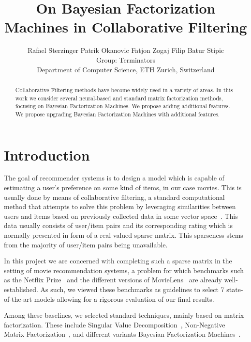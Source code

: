 \documentclass[10pt,conference,compsocconf]{IEEEtran}
\newcommand{\spacing}{\hspace{1cm}}
\begin{document}
    \title{On Bayesian Factorization Machines in Collaborative Filtering}

    \author{
        Rafael Sterzinger \spacing Patrik Okanovic \spacing Fatjon Zogaj \spacing Filip Batur Stipic\\
        Group: Terminators\\
        Department of Computer Science, ETH Zurich, Switzerland
    }

    \maketitle

    \begin{abstract}
        Collaborative Filtering methods have become widely used in a variety of areas. In this work we consider several neural-based and standard matrix factorization methods, focusing on Bayesian Factorization Machines. We propose adding additional features. We propose upgrading Bayesian Factorization Machines with additional features.

    \end{abstract}


    \section{Introduction}

    The goal of recommender systems is to design a model which is capable of estimating a user's preference on some kind of items, in our case movies.
    This is usually done by means of collaborative filtering, a standard computational method that attempts to solve this problem by leveraging similarities between users and items based on previously collected data in some vector space~\cite{CF_survey}.
    This data usually consists of user/item pairs and its corresponding rating which is normally presented in form of a real-valued sparse matrix.
    This sparseness stems from the majority of user/item pairs being unavailable.

    In this project we are concerned with completing such a sparse matrix in the setting of movie recommendation systems, a problem for which benchmarks such as the Netflix Prize~\cite{Netflix} and the different versions of MovieLens~\cite{Movielens} are already well-established.
    As such, we viewed these benchmarks as guidelines to select 7 state-of-the-art models allowing for a rigorous evaluation of our final results.

    Among these baselines, we selected standard techniques, mainly based on matrix factorization.
    These include Singular Value Decomposition~\cite{svd}, Non-Negative Matrix Factorization~\cite{6165290}, and different variants Bayesian Factorization Machines~\cite{freudenthaler_bayesian_2011, salakhutdinov_bayesian_2008}.
\end{document}
